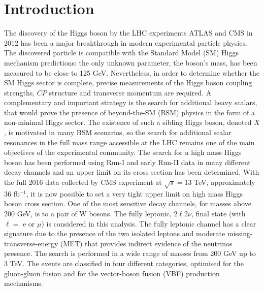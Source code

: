 \documentclass[PhD,binding=0.6cm]{../sapthesis}
\begin{document}
\chapter{Introduction}
The discovery of the Higgs boson by the LHC experiments ATLAS and CMS in 2012 has been a major breakthrough in modern experimental particle physics.
The discovered particle is compatible with the Standard Model (SM) Higgs mechanism predictions: the only unknown parameter, the boson's mass, has been
measured to be  close to 125 GeV. Nevertheless, in order to determine whether the SM Higgs sector is complete, precise measurements of the Higgs boson coupling strengths, $CP$ structure and transverse momentum are required. 
A complementary and important strategy is the search for additional heavy
scalars, that would prove the presence of  beyond-the-SM (BSM) physics in
the form of a non-minimal Higgs sector. The existence of such a sibling Higgs boson,
denoted $X$, is motivated in many BSM scenarios, so the search for additional scalar resonances in the full
mass range accessible at the LHC remains one of the main objectives of the experimental community.
The search for a high mass Higgs boson has been performed using Run-I and
early Run-II data in many different decay channels and an upper limit on its
cross section has been determined. With the full 2016 data collected by CMS
experiment at $\sqrt{s}=$13 TeV, approximately  36 fb$^{-1}$, it is now possible to set a very tight upper limit on high mass Higgs boson cross section.
One of the most sensitive decay channels, for masses above 200 GeV, is to a pair of W bosons. 
The fully leptonic, 2$\ell$2$\nu$,  final state (with $\ell =$ e or $\mu$) is considered in this analysis.
The fully leptonic channel has a clear signature due to the presence of the two isolated leptons and moderate missing-transverse-energy (MET) that provides indirect evidence of the neutrinos presence.
The search is performed in a wide range of masses from 200 GeV up to 3 TeV.
The  events are classified in four different categories, optimised for the gluon-gluon fusion and for the vector-boson fusion (VBF) production mechanisms.
\end{document}
